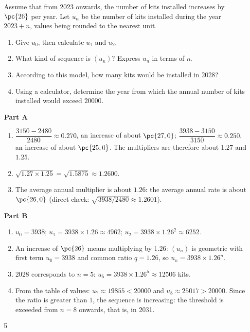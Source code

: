 {Assume that from 2023 onwards, the number of kits installed increases by $\pc{26}$ per year. Let $u_n$ be the number of kits installed during the year $2023+n$, values being rounded to the nearest unit.
\begin{enumerate}
\item Give $u_0$, then calculate $u_1$ and $u_2$.
\item What kind of sequence is $(u_n)$? Express $u_n$ in terms of $n$.
\item According to this model, how many kits would be installed in 2028?
\item Using a calculator, determine the year from which the annual number of kits installed would exceed $\num{20000}$.
\end{enumerate}
}{%
\textbf{Part A}
\begin{enumerate}
\item $\dfrac{\num{3150}-\num{2480}}{\num{2480}}\approx\num{0,270}$, an increase of about $\pc{27,0}$; $\dfrac{\num{3938}-\num{3150}}{\num{3150}}\approx\num{0,250}$, an increase of about $\pc{25,0}$. The multipliers are therefore about $\num{1,27}$ and $\num{1,25}$.
\item $\sqrt{\num{1,27}\times\num{1,25}}=\sqrt{\num{1,5875}}\approx\num{1,2600}$.
\item The average annual multiplier is about $\num{1,26}$: the average annual rate is about $\pc{26,0}$ (direct check: $\sqrt{\num{3938}/\num{2480}}\approx\num{1,2601}$).
\end{enumerate}
\textbf{Part B}
\begin{enumerate}
\item $u_0=\num{3938}$; $u_1=\num{3938}\times\num{1,26}\approx\num{4962}$; $u_2=\num{3938}\times\num{1,26}^2\approx\num{6252}$.
\item An increase of $\pc{26}$ means multiplying by $\num{1,26}$: $(u_n)$ is geometric with first term $u_0=\num{3938}$ and common ratio $q=\num{1,26}$, so $u_n=\num{3938}\times\num{1,26}^n$.
\item 2028 corresponds to $n=5$: $u_5=\num{3938}\times\num{1,26}^5\approx\num{12506}$ kits.
\item From the table of values: $u_7\approx\num{19855}<\num{20000}$ and $u_8\approx\num{25017}>\num{20000}$. Since the ratio is greater than $1$, the sequence is increasing: the threshold is exceeded from $n=8$ onwards, that is, in 2031.
\end{enumerate}
}{5}

